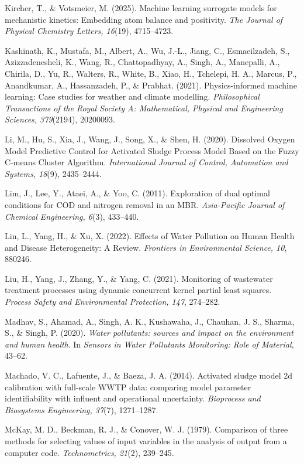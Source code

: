 \documentclass[a4paper,fleqn]{cas-sc}
\begin{document}
\noindent Kircher, T., \& Votsmeier, M. (2025). Machine learning surrogate models for mechanistic kinetics: Embedding atom balance and positivity. \textit{The Journal of Physical Chemistry Letters, 16}(19), 4715--4723.

\noindent Kashinath, K., Mustafa, M., Albert, A., Wu, J.-L., Jiang, C., Esmaeilzadeh, S., Azizzadenesheli, K., Wang, R., Chattopadhyay, A., Singh, A., Manepalli, A., Chirila, D., Yu, R., Walters, R., White, B., Xiao, H., Tchelepi, H. A., Marcus, P., Anandkumar, A., Hassanzadeh, P., \& Prabhat. (2021). Physics-informed machine learning: Case studies for weather and climate modelling. \textit{Philosophical Transactions of the Royal Society A: Mathematical, Physical and Engineering Sciences, 379}(2194), 20200093.

\noindent Li, M., Hu, S., Xia, J., Wang, J., Song, X., \& Shen, H. (2020). Dissolved Oxygen Model Predictive Control for Activated Sludge Process Model Based on the Fuzzy C-means Cluster Algorithm. \textit{International Journal of Control, Automation and Systems, 18}(9), 2435--2444.

\noindent Lim, J., Lee, Y., Ataei, A., \& Yoo, C. (2011). Exploration of dual optimal conditions for COD and nitrogen removal in an MBR. \textit{Asia-Pacific Journal of Chemical Engineering, 6}(3), 433--440.

\noindent Lin, L., Yang, H., \& Xu, X. (2022). Effects of Water Pollution on Human Health and Disease Heterogeneity: A Review. \textit{Frontiers in Environmental Science, 10}, 880246.

\noindent Liu, H., Yang, J., Zhang, Y., \& Yang, C. (2021). Monitoring of wastewater treatment processes using dynamic concurrent kernel partial least squares. \textit{Process Safety and Environmental Protection, 147}, 274--282.

\noindent Madhav, S., Ahamad, A., Singh, A. K., Kushawaha, J., Chauhan, J. S., Sharma, S., \& Singh, P. (2020). \textit{Water pollutants: sources and impact on the environment and human health}. In \textit{Sensors in Water Pollutants Monitoring: Role of Material}, 43--62.

\noindent Machado, V. C., Lafuente, J., \& Baeza, J. A. (2014). Activated sludge model 2d calibration with full-scale WWTP data: comparing model parameter identifiability with influent and operational uncertainty. \textit{Bioprocess and Biosystems Engineering, 37}(7), 1271--1287.

\noindent McKay, M. D., Beckman, R. J., \& Conover, W. J. (1979). Comparison of three methods for selecting values of input variables in the analysis of output from a computer code. \textit{Technometrics, 21}(2), 239--245.
\end{document}
